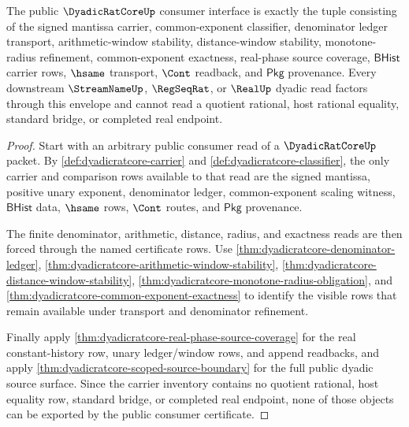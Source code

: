 \begin{theorem}
\label{thm:dyadicratcore-public-readback-envelope}
The public $\DyadicRatCoreUp$ consumer interface is exactly the tuple
consisting of the signed mantissa carrier, common-exponent classifier,
denominator ledger transport, arithmetic-window stability, distance-window
stability, monotone-radius refinement, common-exponent exactness, real-phase
source coverage, $\mathsf{BHist}$ carrier rows, $\hsame$ transport, $\Cont$
readback, and $\mathsf{Pkg}$ provenance. Every downstream $\StreamNameUp$,
$\RegSeqRat$, or $\RealUp$ dyadic read factors through this envelope and cannot
read a quotient rational, host rational equality, standard bridge, or completed
real endpoint.
\end{theorem}
\begin{proof}
Start with an arbitrary public consumer read of a $\DyadicRatCoreUp$ packet.
By \autoref{def:dyadicratcore-carrier} and
\autoref{def:dyadicratcore-classifier}, the only carrier and comparison rows
available to that read are the signed mantissa, positive unary exponent,
denominator ledger, common-exponent scaling witness, $\mathsf{BHist}$ data,
$\hsame$ rows, $\Cont$ routes, and $\mathsf{Pkg}$ provenance.

The finite denominator, arithmetic, distance, radius, and exactness reads are
then forced through the named certificate rows. Use
\autoref{thm:dyadicratcore-denominator-ledger},
\autoref{thm:dyadicratcore-arithmetic-window-stability},
\autoref{thm:dyadicratcore-distance-window-stability},
\autoref{thm:dyadicratcore-monotone-radius-obligation}, and
\autoref{thm:dyadicratcore-common-exponent-exactness} to identify the visible
rows that remain available under transport and denominator refinement.

Finally apply \autoref{thm:dyadicratcore-real-phase-source-coverage} for the
real constant-history row, unary ledger/window rows, and append readbacks, and
apply \autoref{thm:dyadicratcore-scoped-source-boundary} for the full public
dyadic source surface. Since the carrier inventory contains no quotient
rational, host equality row, standard bridge, or completed real endpoint, none
of those objects can be exported by the public consumer certificate.
\end{proof}
